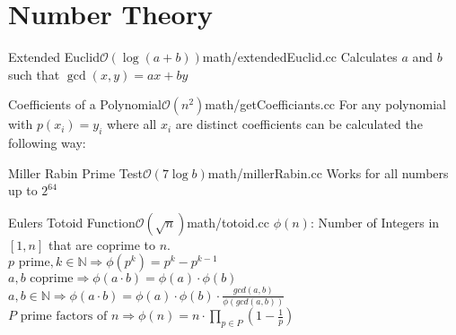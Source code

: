 \section{Number Theory}
\begin{code}{Extended Euclid}{$\mathcal{O}(\log(a + b))$}{math/extendedEuclid.cc} 
 Calculates $a$ and $b$ such that $\gcd(x, y) = ax + by$
\end{code}

\begin{code}{Coefficients of a Polynomial}{$\mathcal{O}(n^2)$}{math/getCoefficiants.cc}
  For any polynomial with $p(x_i) = y_i$ where all $x_i$ are distinct coefficients can be calculated the following way:
\end{code}


\begin{code}{Miller Rabin Prime Test}{$\mathcal{O}(7\log b)$}{math/millerRabin.cc}
  Works for all numbers up to $2^{64}$
\end{code}

\begin{code}{Eulers Totoid Function}{$\mathcal{O}(\sqrt{n})$}{math/totoid.cc}
$\phi(n)$: Number of Integers in $[1, n]$ that are coprime to $n$.\\
$p \text{ prime}, k \in \mathbb{N} \Rightarrow \phi(p^k) = p^k - p^{k-1}$ \\
$a, b \text{ coprime} \Rightarrow \phi(a \cdot b) = \phi(a) \cdot \phi(b)$ \\
$a, b \in \mathbb{N} \Rightarrow \phi(a \cdot b) = \phi(a) \cdot \phi(b) \cdot \frac{gcd(a, b)}{\phi(gcd(a,b))}$ \\
$P \text{ prime factors of } n \Rightarrow \phi(n) = n \cdot \prod_{p \in P} (1 - \frac{1}{p})$
\end{code}


